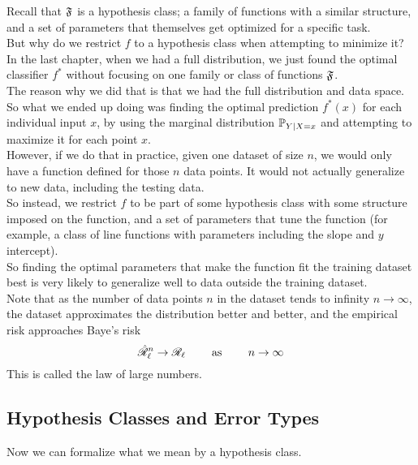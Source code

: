\documentclass[12pt]{article}
\begin{document}
Recall that $\mathfrak{F}$ is a hypothesis class;
a family of functions with a similar structure,
and a set of parameters that themselves
get optimized for a specific task. \\

But why do we restrict $f$
to a hypothesis class when attempting
to minimize it? \\

In the last chapter, when we had a full distribution,
we just found the optimal classifier $f^*$
without focusing on one family or class
of functions $\mathfrak{F}$. \\
The reason why we did that is that we had the
full distribution and data space.
So what we ended up doing was finding the
optimal prediction $f^*(x)$
for each individual input $x$,
by using the marginal distribution 
$\mathbb{P}_{Y \mid X = x}$ and attempting to maximize
it for each point $x$. \\

However, if we do that in practice,
given one dataset of size $n$,
we would only have a function defined
for those $n$ data points.
It would not actually generalize to new
data, including the testing data. \\

So instead, we restrict $f$
to be part of some hypothesis class
with some structure imposed on the function,
and a set of parameters that tune the
function (for example, a class of line functions
with parameters including the slope 
and $y$ intercept). \\
So finding the optimal parameters that make
the function fit the training dataset best
is very likely to generalize well
to data outside the training dataset. \\

Note that as the number of data points $n$
in the dataset tends to infinity $n \to \infty$,
the dataset approximates the distribution
better and better,
and the empirical risk approaches Baye's risk
\[ \hat{\mathscr{R}}_\ell^n \to \mathscr{R}_\ell  
\qquad \text{ as } \qquad n \to \infty \]
This is called the law of large numbers. \\

\newpage

\subsection*{Hypothesis Classes and Error Types}

Now we can formalize what we mean
by a hypothesis class. \\
\end{document}
